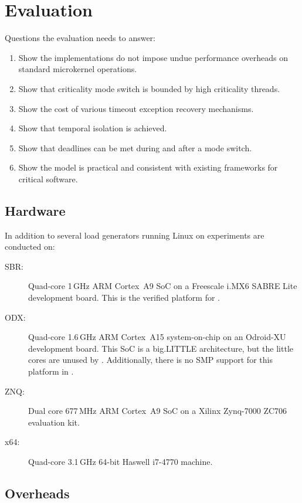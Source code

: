 \chapter{Evaluation}
\label{chap:evaluation}

Questions the evaluation needs to answer:

\begin{enumerate}
\item Show the implementations do not impose undue performance overheads on standard microkernel
operations.
\item Show that criticality mode switch is bounded by high criticality threads.
\item Show the cost of various timeout exception recovery mechanisms.
\item Show that temporal isolation is achieved.
\item Show that deadlines can be met during and after a mode switch.
\item Show the model is practical and consistent with existing frameworks for critical software.
\end{enumerate}

\section{Hardware}

In addition to several load generators running Linux on experiments are conducted on:

\begin{description}
    \item[SBR:] Quad-core 1\,GHz ARM Cortex~A9 \gls{SoC} on a Freescale i.MX6 SABRE Lite
        development board. This is the verified platform for \selfour.
    \item[ODX:] Quad-core 1.6\,GHz ARM Cortex~A15 system-on-chip on an Odroid-XU development board.
        This \gls{SoC} is a big.LITTLE architecture, but the little cores are unused by \selfour.
        Additionally, there is no SMP support for this platform in \selfour.
    \item[ZNQ:] Dual core 677\,MHz ARM Cortex~A9 \gls{SoC} on a Xilinx Zynq-7000 ZC706 evaluation
        kit.
    \item[x64:] Quad-core 3.1\,GHz 64-bit Haswell i7-4770 machine.
    
\end{description}


\section{Overheads}

